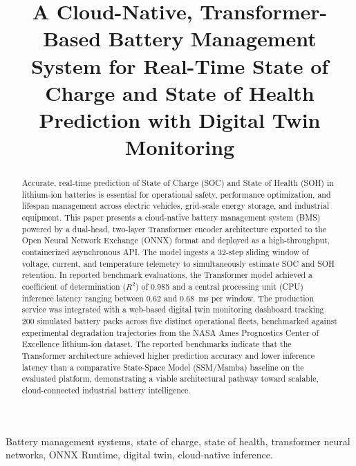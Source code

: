 \documentclass[conference]{IEEEtran}
\begin{document}
\title{A Cloud-Native, Transformer-Based Battery Management System for Real-Time State of Charge and State of Health Prediction with Digital Twin Monitoring}

\author{
}

\maketitle

\begin{abstract}
Accurate, real-time prediction of State of Charge (SOC) and State of Health (SOH) in lithium-ion batteries is essential for operational safety, performance optimization, and lifespan management across electric vehicles, grid-scale energy storage, and industrial equipment. This paper presents a cloud-native battery management system (BMS) powered by a dual-head, two-layer Transformer encoder architecture exported to the Open Neural Network Exchange (ONNX) format and deployed as a high-throughput, containerized asynchronous API. The model ingests a 32-step sliding window of voltage, current, and temperature telemetry to simultaneously estimate SOC and SOH retention. In reported benchmark evaluations, the Transformer model achieved a coefficient of determination ($R^2$) of 0.985 and a central processing unit (CPU) inference latency ranging between 0.62 and 0.68~ms per window. The production service was integrated with a web-based digital twin monitoring dashboard tracking 200 simulated battery packs across five distinct operational fleets, benchmarked against experimental degradation trajectories from the NASA Ames Prognostics Center of Excellence lithium-ion dataset. The reported benchmarks indicate that the Transformer architecture achieved higher prediction accuracy and lower inference latency than a comparative State-Space Model (SSM/Mamba) baseline on the evaluated platform, demonstrating a viable architectural pathway toward scalable, cloud-connected industrial battery intelligence.
\end{abstract}

\begin{IEEEkeywords}
Battery management systems, state of charge, state of health, transformer neural networks, ONNX Runtime, digital twin, cloud-native inference.
\end{IEEEkeywords}
\end{document}
